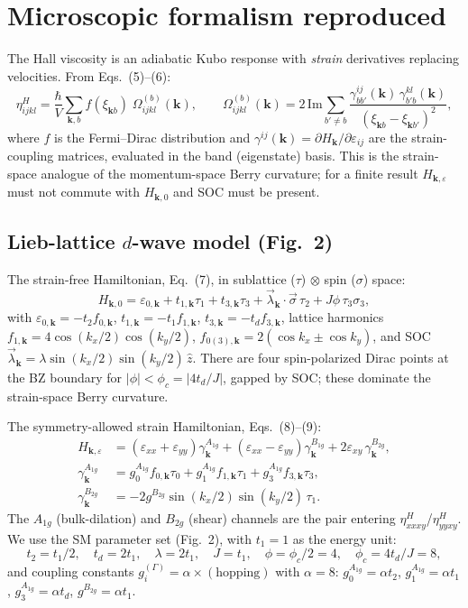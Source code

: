 \documentclass[11pt,a4paper]{article}
\newcommand{\etaH}{\eta^{H}}
\begin{document}
\section{Microscopic formalism reproduced}
The Hall viscosity is an adiabatic Kubo response with \emph{strain} derivatives
replacing velocities. From Eqs.~(5)--(6):
\begin{equation}
\etaH_{ijkl} = \frac{\hbar}{V}\sum_{\bm{k},b} f(\xi_{\bm{k}b})\;
\Omega^{(b)}_{ijkl}(\bm{k}),
\qquad
\Omega^{(b)}_{ijkl}(\bm{k}) = 2\,\mathrm{Im}
\sum_{b'\neq b}
\frac{\gamma^{ij}_{bb'}(\bm{k})\,\gamma^{kl}_{b'b}(\bm{k})}
{\left(\xi_{\bm{k}b}-\xi_{\bm{k}b'}\right)^2},
\end{equation}
where $f$ is the Fermi--Dirac distribution and $\gamma^{ij}(\bm{k})=\partial
H_{\bm{k}}/\partial\varepsilon_{ij}$ are the strain-coupling matrices, evaluated
in the band (eigenstate) basis. This is the strain-space analogue of the
momentum-space Berry curvature; for a finite result $H_{\bm{k},\varepsilon}$ must
not commute with $H_{\bm{k},0}$ and SOC must be present.

\subsection{Lieb-lattice $d$-wave model (Fig.~2)}
The strain-free Hamiltonian, Eq.~(7), in sublattice ($\tau$) $\otimes$ spin
($\sigma$) space:
\begin{equation}
H_{\bm{k},0} = \varepsilon_{0,\bm{k}} + t_{1,\bm{k}}\tau_1 + t_{3,\bm{k}}\tau_3
+ \vec{\lambda}_{\bm{k}}\cdot\vec{\sigma}\,\tau_2 + J\phi\,\tau_3\sigma_3,
\end{equation}
with $\varepsilon_{0,\bm{k}}=-t_2 f_{0,\bm{k}}$, $t_{1,\bm{k}}=-t_1 f_{1,\bm{k}}$,
$t_{3,\bm{k}}=-t_d f_{3,\bm{k}}$, lattice harmonics
$f_{1,\bm{k}}=4\cos(k_x/2)\cos(k_y/2)$,
$f_{0(3),\bm{k}}=2(\cos k_x \pm \cos k_y)$, and SOC
$\vec\lambda_{\bm{k}}=\lambda\sin(k_x/2)\sin(k_y/2)\,\hat z$. There are four
spin-polarized Dirac points at the BZ boundary for $|\phi|<\phi_c=|4t_d/J|$,
gapped by SOC; these dominate the strain-space Berry curvature.

The symmetry-allowed strain Hamiltonian, Eqs.~(8)--(9):
\begin{align}
H_{\bm{k},\varepsilon} &= (\varepsilon_{xx}+\varepsilon_{yy})\gamma^{A_{1g}}_{\bm{k}}
 + (\varepsilon_{xx}-\varepsilon_{yy})\gamma^{B_{1g}}_{\bm{k}}
 + 2\varepsilon_{xy}\,\gamma^{B_{2g}}_{\bm{k}}, \\
\gamma^{A_{1g}}_{\bm{k}} &= g_0^{A_{1g}} f_{0,\bm{k}}\tau_0
 + g_1^{A_{1g}} f_{1,\bm{k}}\tau_1 + g_3^{A_{1g}} f_{3,\bm{k}}\tau_3, \\
\gamma^{B_{2g}}_{\bm{k}} &= -2 g^{B_{2g}} \sin(k_x/2)\sin(k_y/2)\,\tau_1 .
\end{align}
The $A_{1g}$ (bulk-dilation) and $B_{2g}$ (shear) channels are the pair entering
$\eta^{H}_{xxxy}$/$\eta^{H}_{yyxy}$. We use the SM parameter set (Fig.~2), with
$t_1=1$ as the energy unit:
\[
t_2=t_1/2,\quad t_d=2t_1,\quad \lambda=2t_1,\quad J=t_1,\quad
\phi=\phi_c/2=4,\quad \phi_c=4t_d/J=8,
\]
and coupling constants $g_i^{(\Gamma)}=\alpha\times(\text{hopping})$ with
$\alpha=8$: $g_0^{A_{1g}}=\alpha t_2$, $g_1^{A_{1g}}=\alpha t_1$,
$g_3^{A_{1g}}=\alpha t_d$, $g^{B_{2g}}=\alpha t_1$.
\end{document}
